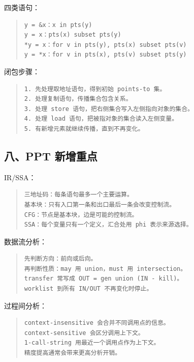 \documentclass[UTF8,zihao=-4]{ctexart}
\begin{document}
四类语句：


\begin{quote}
\footnotesize
\begin{verbatim}
y = &x：x in pts(y)
y = x：pts(x) subset pts(y)
*y = x：for v in pts(y), pts(x) subset pts(v)
y = *x：for v in pts(x), pts(v) subset pts(y)
\end{verbatim}
\end{quote}


闭包步骤：


\begin{quote}
\footnotesize
\begin{verbatim}
1. 先处理取地址语句，得到初始 points-to 集。
2. 处理复制语句，传播集合包含关系。
3. 处理 store 语句，把右侧集合写入左侧指向对象的集合。
4. 处理 load 语句，把被指对象的集合读入左侧变量。
5. 有新增元素就继续传播，直到不再变化。
\end{verbatim}
\end{quote}


\subsection{八、PPT 新增重点}


IR/SSA：


\begin{quote}
\footnotesize
\begin{verbatim}
三地址码：每条语句最多一个主要运算。
基本块：只有入口第一条和出口最后一条会改变控制流。
CFG：节点是基本块，边是可能的控制流。
SSA：每个变量只有一个定义，汇合处用 phi 表示来源选择。
\end{verbatim}
\end{quote}


数据流分析：


\begin{quote}
\footnotesize
\begin{verbatim}
先判断方向：前向或后向。
再判断性质：may 用 union，must 用 intersection。
transfer 常写成 OUT = gen union (IN - kill)。
worklist 到所有 IN/OUT 不再变化时停止。
\end{verbatim}
\end{quote}


过程间分析：


\begin{quote}
\footnotesize
\begin{verbatim}
context-insensitive 会合并不同调用点的信息。
context-sensitive 会区分调用上下文。
1-call-string 用最近一个调用点作为上下文。
精度提高通常会带来更高分析开销。
\end{verbatim}
\end{quote}
\end{document}
